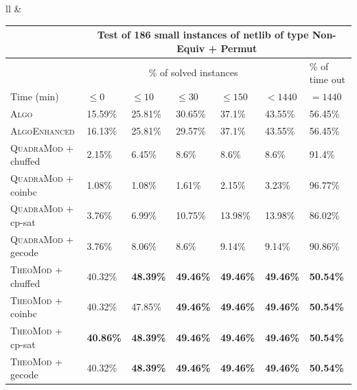 \documentclass{book}
\begin{document}
\begin{tabular}{ll}
 & \hspace{0.5cm}
\begin{tabular}{|l|l|l|l|l|l|l|}\toprule & \multicolumn{6}{|c|}{Test of 186 small instances of netlib of type Non-Equiv + Permut}\\\midrule
 & \multicolumn{5}{|c|}{\% of solved instances} & \% of time out\\
\midrule
 Time (min)  & $\leq 0$ & $\leq 10$ & $\leq 30$ & $\leq 150$ & $ < 1440$ & $= 1440$ \\
\midrule
\textsc{Algo}   & 15.59\% & 25.81\% & 30.65\% & 37.1\% & 43.55\% & 56.45\% \\
\textsc{AlgoEnhanced}   & 16.13\% & 25.81\% & 29.57\% & 37.1\% & 43.55\% & 56.45\% \\
\textsc{QuadraMod} + chuffed   & 2.15\% & 6.45\% & 8.6\% & 8.6\% & 8.6\% & 91.4\% \\
\textsc{QuadraMod} + coinbc   & 1.08\% & 1.08\% & 1.61\% & 2.15\% & 3.23\% & 96.77\% \\
\textsc{QuadraMod} + cp-sat   & 3.76\% & 6.99\% & 10.75\% & 13.98\% & 13.98\% & 86.02\% \\
\textsc{QuadraMod} + gecode   & 3.76\% & 8.06\% & 8.6\% & 9.14\% & 9.14\% & 90.86\% \\
\textsc{TheoMod} + chuffed   & 40.32\% & \bf 48.39\% & \bf 49.46\% & \bf 49.46\% & \bf 49.46\% &  \bf 50.54\% \\
\textsc{TheoMod} + coinbc   & 40.32\% & 47.85\% & \bf 49.46\% & \bf 49.46\% & \bf 49.46\% &  \bf 50.54\% \\
\textsc{TheoMod} + cp-sat   & \bf 40.86\% & \bf 48.39\% & \bf 49.46\% & \bf 49.46\% & \bf 49.46\% &  \bf 50.54\% \\
\textsc{TheoMod} + gecode   & 40.32\% & \bf 48.39\% & \bf 49.46\% & \bf 49.46\% & \bf 49.46\% &  \bf 50.54\% \\
\bottomrule\end{tabular} 

\\\\

\end{tabular}



\newpage
\end{document}
